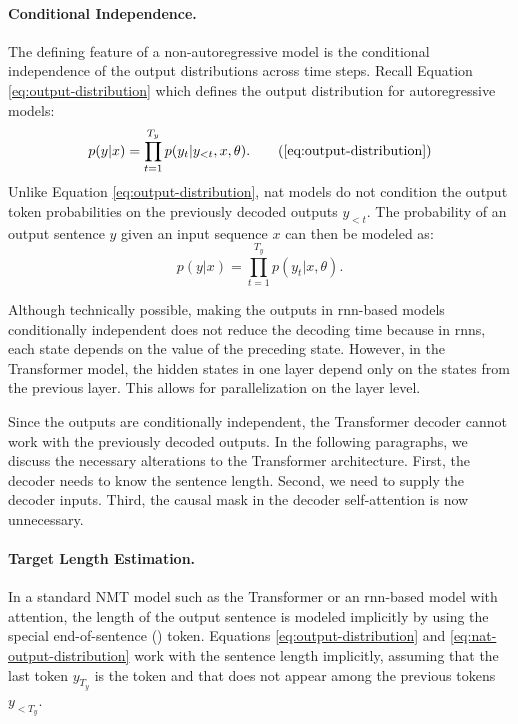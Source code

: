 \paragraph{Conditional Independence.} The defining feature of a
non-autoregressive model is the conditional independence of the output
distributions across time steps. Recall Equation \ref{eq:output-distribution}
which defines the output distribution for autoregressive models:
%
\begin{equation*}
  p(y|x) = \prod_{t=1}^{T_y}p(y_t|y_{<t},x,\theta).
  \tag{\ref{eq:output-distribution}}
\end{equation*}
%
Unlike Equation \ref{eq:output-distribution}, \Ac{nat} models do not condition
the output token probabilities on the previously decoded outputs $y_{<t}$.  The
probability of an output sentence $y$ given an input sequence $x$ can then be
modeled as:
%
\begin{equation}
  p(y|x) = \prod_{t=1}^{T_y}p(y_t|x,\theta).
  \label{eq:nat-output-distribution}
\end{equation}

Although technically possible, making the outputs in \acs{rnn}-based models
conditionally independent does not reduce the decoding time because in
\acsp{rnn}, each state depends on the value of the preceding state. However, in
the Transformer model, the hidden states in one layer depend only on the states
from the previous layer. This allows for parallelization on the layer level.

Since the outputs are conditionally independent, the Transformer decoder cannot
work with the previously decoded outputs. In the following paragraphs, we
discuss the necessary alterations to the Transformer architecture.  First, the
decoder needs to know the sentence length. Second, we need to supply the
decoder inputs. Third, the causal mask in the decoder self-attention is now
unnecessary.

\paragraph{Target Length Estimation.} In a standard NMT model such as the
Transformer or an \acs{rnn}-based model with attention, the length of the
output sentence is modeled implicitly by using the special end-of-sentence
(\eos{}) token. Equations \ref{eq:output-distribution} and
\ref{eq:nat-output-distribution} work with the sentence length implicitly,
assuming that the last token $y_{T_y}$ is the \eos{} token and that \eos{} does
not appear among the previous tokens $y_{<T_y}$.

